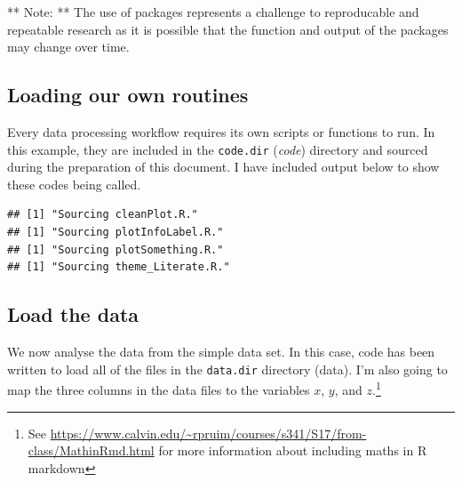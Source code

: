 \documentclass[11pt,]{article}
\newenvironment{Shaded}{\begin{snugshade}}{\end{snugshade}}
\newcommand{\CharTok}[1]{\textcolor[rgb]{0.31,0.60,0.02}{#1}}
\newcommand{\CommentTok}[1]{\textcolor[rgb]{0.56,0.35,0.01}{\textit{#1}}}
\newcommand{\ControlFlowTok}[1]{\textcolor[rgb]{0.13,0.29,0.53}{\textbf{#1}}}
\newcommand{\DataTypeTok}[1]{\textcolor[rgb]{0.13,0.29,0.53}{#1}}
\newcommand{\KeywordTok}[1]{\textcolor[rgb]{0.13,0.29,0.53}{\textbf{#1}}}
\newcommand{\NormalTok}[1]{#1}
\newcommand{\StringTok}[1]{\textcolor[rgb]{0.31,0.60,0.02}{#1}}
\let\rmarkdownfootnote\footnote%
\def\footnote{\protect\rmarkdownfootnote}
\begin{document}
** Note: ** The use of packages represents a challenge to reproducable and repeatable research as it is possible that the function and output of the packages may change over time.

\hypertarget{loading-our-own-routines}{%
\subsection{Loading our own routines}\label{loading-our-own-routines}}

Every data processing workflow requires its own scripts or functions to run. In this example, they are included in the \texttt{code.dir} (\emph{code}) directory and sourced during the preparation of this document. I have included output below to show these codes being called.

\begin{Shaded}
\end{Shaded}

\begin{verbatim}
## [1] "Sourcing cleanPlot.R."
## [1] "Sourcing plotInfoLabel.R."
## [1] "Sourcing plotSomething.R."
## [1] "Sourcing theme_Literate.R."
\end{verbatim}

\hypertarget{load-the-data}{%
\subsection{Load the data}\label{load-the-data}}

We now analyse the data from the simple data set. In this case, code has been written to load all of the files in the \texttt{data.dir} directory (data). I'm also going to map the three columns in the data files to the variables \(x\), \(y\), and \(z\).\footnote{See \url{https://www.calvin.edu/~rpruim/courses/s341/S17/from-class/MathinRmd.html} for more information about including maths in R markdown}
\end{document}
